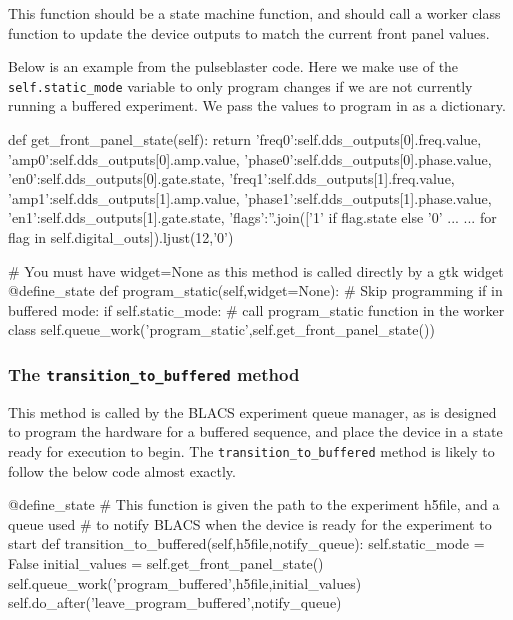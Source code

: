\documentclass[12pt]{article}
\begin{document}
This function should be a state machine function, and should call a worker class function to update the device outputs to match the current front panel values.

Below is an example from the pulseblaster code. Here we make use of the \texttt{self.static\_mode} variable to only program changes if we are not currently running a buffered experiment. We pass the values to program in as a dictionary.

\begin{python}
    def get_front_panel_state(self):
        return {'freq0':self.dds_outputs[0].freq.value,
                'amp0':self.dds_outputs[0].amp.value,
                'phase0':self.dds_outputs[0].phase.value,
                'en0':self.dds_outputs[0].gate.state,
                'freq1':self.dds_outputs[1].freq.value,
                'amp1':self.dds_outputs[1].amp.value,
                'phase1':self.dds_outputs[1].phase.value,
                'en1':self.dds_outputs[1].gate.state,
                'flags':''.join(['1' if flag.state else '0' ...
                ... for flag in self.digital_outs]).ljust(12,'0')}
    
    # You must have widget=None as this method is called directly by a gtk widget
    @define_state
    def program_static(self,widget=None):
        # Skip programming if in buffered mode:
        if self.static_mode:
        	# call program_static function in the worker class
            self.queue_work('program_static',self.get_front_panel_state())
\end{python}

\subsubsection{The \texttt{transition\_to\_buffered} method}\label{device_class_transition_to_buffered}
This method is called by the BLACS experiment queue manager, as is designed to program the hardware for a buffered sequence, and place the device in a state ready for execution to begin. The \texttt{transition\_to\_buffered} method is likely to follow the below code almost exactly.
\begin{python}
@define_state
    # This function is given the path to the experiment h5file, and a queue used
    # to notify BLACS when the device is ready for the experiment to start
    def transition_to_buffered(self,h5file,notify_queue):
        self.static_mode = False 
        initial_values = self.get_front_panel_state()
        self.queue_work('program_buffered',h5file,initial_values)
        self.do_after('leave_program_buffered',notify_queue)
\end{python}
\end{document}
